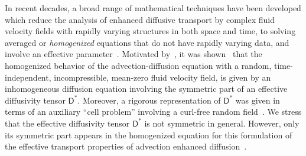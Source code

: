\documentclass[leqno,onefignum,onetabnum]{siamltex1213}
\newcommand{\Dm}{\mathsf{D}}
\begin{document}
In recent decades, a broad range of mathematical techniques have been
developed
%
%
which reduce the analysis of enhanced diffusive transport by complex
fluid velocity fields with rapidly varying structures in both space
and time, to 
solving averaged or \emph{homogenized} equations that do not have
rapidly varying data, and involve an effective
parameter~\cite{Papanicolaou:1981:36:8,McLaughlin:SIAM_JAM:780,Bensoussan:Book:1978,Biferale:PF:2725,Fannjiang:1994:SIAM_JAM:333,Novikov:2005:CPAM:867,Fannjiang:1997:1033,Mauri:1991:3:743,Pavliotis:PHD_Thesis,Pavliotis:CMS:2007:507,Clark:1998:364,Holmes:1995:94481954,Hornung:1997:9780387947860,Majda:Kramer:1999:book,Majda:1994:10.1088,Xin:2009:Fronts:9780387876832}. Motivated
by~\cite{Papanicolaou:RF-835}, it was
shown~\cite{McLaughlin:SIAM_JAM:780} that the homogenized behavior of
the advection-diffusion equation with a random, time-independent,
incompressible, mean-zero fluid velocity field, is given by an
inhomogeneous diffusion equation involving the symmetric part of an
effective diffusivity tensor $\Dm^*$. Moreover, a rigorous
representation of $\Dm^*$ was given in terms of an auxiliary ``cell
problem'' involving a curl-free random
field~\cite{McLaughlin:SIAM_JAM:780}. We stress that the effective
diffusivity tensor $\Dm^*$ is not symmetric in general. However, only
its symmetric part appears in the homogenized equation for this
formulation of the effective transport properties of advection
enhanced diffusion~\cite{McLaughlin:SIAM_JAM:780}.    
\end{document}
